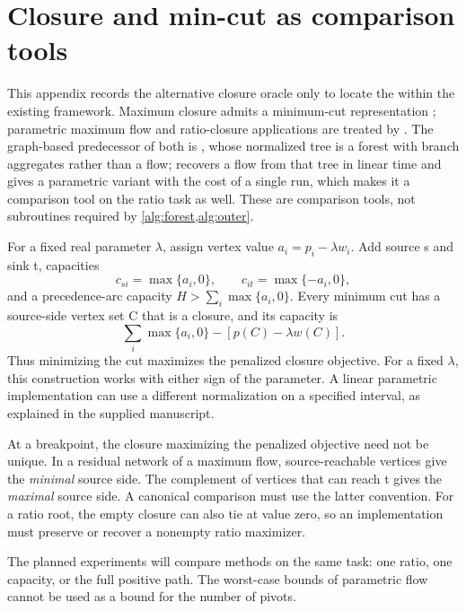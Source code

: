\section{Closure and min-cut as comparison tools}\label{app:flow}

This appendix records the alternative closure oracle only to locate the
\FSC{} within the existing framework. Maximum closure admits
a minimum-cut representation \citep{Picard1976}; parametric maximum flow
and ratio-closure applications are treated by \citet{GalloEtAl1989}. The
graph-based predecessor of both is \citet{LerchsGrossmann1965}, whose
normalized tree is a forest with branch aggregates rather than a flow;
\citet{Hochbaum2001} recovers a flow from that tree in linear time and gives a
parametric variant with the cost of a single run, which makes it a comparison
tool on the ratio task as well.
These are comparison tools, not subroutines required by
\cref{alg:forest,alg:outer}.

For a fixed real parameter $\lambda$, assign vertex value
$a_i=p_i-\lambda w_i$. Add source s and sink t, capacities
\[
 c_{si}=\max\{a_i,0\},\qquad
 c_{it}=\max\{-a_i,0\},
\]
and a precedence-arc capacity $H>\sum_i\max\{a_i,0\}$.
Every minimum cut has a source-side vertex set C that is a closure, and its
capacity is
\[
 \sum_i\max\{a_i,0\}-[p(C)-\lambda w(C)].
\]
Thus minimizing the cut maximizes the penalized closure objective.
For a fixed $\lambda$, this construction works with either sign of the
parameter. A linear parametric implementation can use a different
normalization on a specified interval, as explained in the supplied manuscript.

At a breakpoint, the closure maximizing the penalized objective need not be
unique. In a residual network of a maximum flow, source-reachable vertices
give the \emph{minimal} source side. The complement of vertices that can
reach t gives the \emph{maximal} source side. A canonical comparison must use
the latter convention. For a ratio root, the empty closure can also tie at
value zero, so an implementation must preserve or recover a nonempty ratio
maximizer.

The planned experiments will compare methods on the same task: one ratio,
one capacity, or the full positive path. The worst-case bounds of parametric
flow cannot be used as a bound for the number of \FS{} pivots.
